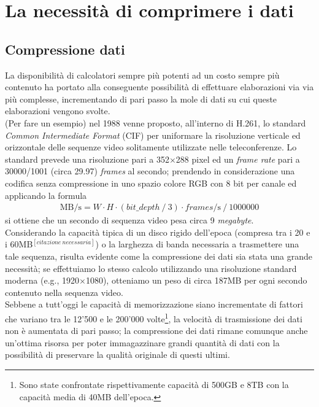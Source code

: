 
\chapter{La necessità di comprimere i dati} %

\label{Chapter3}



\section{Compressione dati}
La disponibilità di calcolatori sempre più potenti ad un costo sempre più
contenuto ha portato alla conseguente possibilità di effettuare elaborazioni
via via più complesse, incrementando di pari passo la mole di dati su cui
queste elaborazioni vengono svolte. \\
(Per fare un esempio) nel 1988 venne proposto, all'interno di H.261, lo standard
\emph{Common Intermediate Format} (CIF) per uniformare la risoluzione verticale
ed orizzontale delle sequenze video solitamente utilizzate nelle teleconferenze.
Lo standard prevede una risoluzione pari a 352${\times}$288 pixel ed un
\emph{frame rate} pari a 30000/1001 (circa 29.97) \emph{frames} al secondo;
prendendo in considerazione una codifica senza compressione in uno spazio
colore RGB con 8 bit per canale ed applicando la formula
\begin{align*}
  \text{MB}\!/\!\text{s} = 
  W \cdot H \cdot (bit\_depth \:/\: 3) \cdot frames\!/\!\text{s} \:/\: 1000000
\end{align*}
si ottiene che un secondo di sequenza video pesa circa 9 \emph{megabyte}. \\
Considerando la capacità tipica di un disco rigido dell'epoca (compresa
tra i 20 e i 60MB$^{[citazione\: necessaria]}$) o la larghezza di banda 
necessaria a trasmettere una tale sequenza, risulta evidente come la 
compressione dei dati sia stata una grande necessità; se effettuiamo lo stesso 
calcolo utilizzando una risoluzione standard moderna (e.g., 1920$\times$1080), 
otteniamo un peso di circa 187MB per ogni secondo contenuto nella sequenza 
video. \\
Sebbene a tutt'oggi le capacità di memorizzazione siano incrementate di fattori
che variano tra le 12'500 e le 200'000 volte\footnote{Sono state confrontate
rispettivamente capacità di 500GB e 8TB con la capacità media di 40MB 
dell'epoca.}, la velocità di trasmissione dei dati non è aumentata di pari 
passo; la compressione dei dati rimane comunque anche un'ottima risorsa per
poter immagazzinare grandi quantità di dati con la possibilità di preservare
la qualità originale di questi ultimi.
